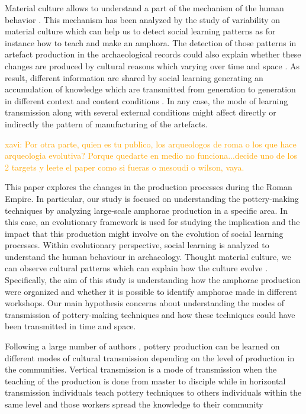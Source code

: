 \documentclass[review]{elsarticle}
\newcommand{\memo}[2]{\textcolor{#1}{#2}}
\newcommand{\xavi}[1]{\memo{orange}{xavi: #1\\}}
\begin{document}
Material culture allows to understand a part of the mechanism of the human behavior \citep{richerson2005not, schillinger_copying_2016}. This mechanism has been analyzed by the study of variability on material culture which can help us to detect social learning patterns as for instance how to teach and make an amphora. The detection of those patterns in artefact production in the archaeological records could also explain whether these changes are produced by cultural reasons which varying over time and space \citep{basalla1988evolution}. As result, different information are shared by social learning generating an accumulation of knowledge which are transmitted from generation to generation in different context and content conditions \citep{eerkens_jelmer_cultural_2005, neff1992ceramics,henrich_evolution_2003, boyd_cultural_2011}. In any case, the mode of learning transmission along with several external conditions might affect directly or indirectly the pattern of manufacturing of the artefacts.

\xavi{Por otra parte, quien es tu publico, los arqueologos de roma o los que hace arqueologia evolutiva? Porque quedarte en medio no funciona...decide uno de los 2 targets y leete el paper como si fueras o mesoudi o wilson, vaya.}

This paper explores the changes in the production processes during the Roman Empire. In particular, our study is focused on understanding the pottery-making techniques by analyzing large-scale amphorae production in a specific area. In this case, an evolutionary framework is used for studying the implication and the impact that this production might involve on the  evolution of social learning processes. Within evolutionary perspective, social learning is analyzed to understand the human behaviour in archaeology. Thought material culture, we can observe cultural patterns which can explain how the culture evolve \citep{richerson2005not}. Specifically, the aim of this study is understanding how the amphorae production were organized and whether it is possible to identify amphorae made in different workshops. Our main hypothesis concerns about understanding the modes of transmission of pottery-making techniques and how these techniques could have been transmitted in time and space. 

Following a large number of authors \citep{cavalli-sforza_cultural_1981, hosfield_modes_2009}, pottery production can be learned on different modes of cultural transmission depending on the level of production in the communities. Vertical transmission is a mode of transmission when the teaching of the production is done from master to disciple while in horizontal transmission individuals teach pottery techniques to others individuals within the same level and those workers spread the knowledge to their community \citep{epstein_craft_1998}
\end{document}
